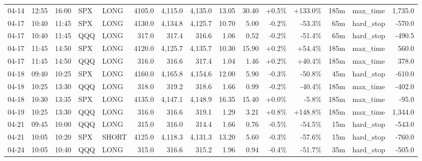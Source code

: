 \documentclass[11pt,a4paper,twoside]{article}
\begin{document}
\begin{landscape}
\begin{center}
\begin{longtable}{>{\color{txtmain}}l l l l l r r r r r r r r >{\color{txtmain}}l r}
04-14 & 12:55 & 16:00 & SPX & LONG & 4105.0 & 4,115.0 & 4,135.0 & 13.05 & 30.40 & \textcolor{wingreen}{+0.5\%} & \textcolor{wingreen}{+133.0\%} & 185m & max\_time & \textcolor{wingreen}{1,735.0} \\
04-17 & 10:40 & 11:45 & SPX & LONG & 4130.0 & 4,134.8 & 4,125.7 & 10.70 & 5.00 & \textcolor{lossred}{-0.2\%} & \textcolor{lossred}{-53.3\%} & 65m & hard\_stop & \textcolor{lossred}{-570.0} \\
04-17 & 10:40 & 11:45 & QQQ & LONG & 317.0 & 317.4 & 316.6 & 1.06 & 0.52 & \textcolor{lossred}{-0.2\%} & \textcolor{lossred}{-51.4\%} & 65m & hard\_stop & \textcolor{lossred}{-490.5} \\
04-17 & 11:45 & 14:50 & SPX & LONG & 4120.0 & 4,125.7 & 4,135.7 & 10.30 & 15.90 & \textcolor{wingreen}{+0.2\%} & \textcolor{wingreen}{+54.4\%} & 185m & max\_time & \textcolor{wingreen}{560.0} \\
04-17 & 11:45 & 14:50 & QQQ & LONG & 316.0 & 316.6 & 317.4 & 1.04 & 1.46 & \textcolor{wingreen}{+0.2\%} & \textcolor{wingreen}{+40.4\%} & 185m & max\_time & \textcolor{wingreen}{378.0} \\
04-18 & 09:40 & 10:25 & SPX & LONG & 4160.0 & 4,165.8 & 4,154.6 & 12.00 & 5.90 & \textcolor{lossred}{-0.3\%} & \textcolor{lossred}{-50.8\%} & 45m & hard\_stop & \textcolor{lossred}{-610.0} \\
04-18 & 10:25 & 13:30 & QQQ & LONG & 318.0 & 319.2 & 318.6 & 1.66 & 0.99 & \textcolor{lossred}{-0.2\%} & \textcolor{lossred}{-40.4\%} & 185m & max\_time & \textcolor{lossred}{-402.0} \\
04-18 & 10:30 & 13:35 & SPX & LONG & 4135.0 & 4,147.1 & 4,148.9 & 16.35 & 15.40 & \textcolor{wingreen}{+0.0\%} & \textcolor{lossred}{-5.8\%} & 185m & max\_time & \textcolor{lossred}{-95.0} \\
04-19 & 10:25 & 13:30 & QQQ & LONG & 316.0 & 316.6 & 319.1 & 1.29 & 3.21 & \textcolor{wingreen}{+0.8\%} & \textcolor{wingreen}{+148.8\%} & 185m & max\_time & \textcolor{wingreen}{1,344.0} \\
04-21 & 09:45 & 10:00 & QQQ & LONG & 315.0 & 316.0 & 314.4 & 1.66 & 0.76 & \textcolor{lossred}{-0.5\%} & \textcolor{lossred}{-54.5\%} & 15m & hard\_stop & \textcolor{lossred}{-543.0} \\
04-21 & 10:05 & 10:20 & SPX & SHORT & 4125.0 & 4,118.3 & 4,131.3 & 13.20 & 5.60 & \textcolor{lossred}{-0.3\%} & \textcolor{lossred}{-57.6\%} & 15m & hard\_stop & \textcolor{lossred}{-760.0} \\
04-24 & 10:05 & 10:40 & QQQ & LONG & 315.0 & 316.6 & 315.2 & 1.96 & 0.94 & \textcolor{lossred}{-0.4\%} & \textcolor{lossred}{-51.7\%} & 35m & hard\_stop & \textcolor{lossred}{-505.0} \\

\end{longtable}
\end{center}
\end{landscape}
\end{document}
